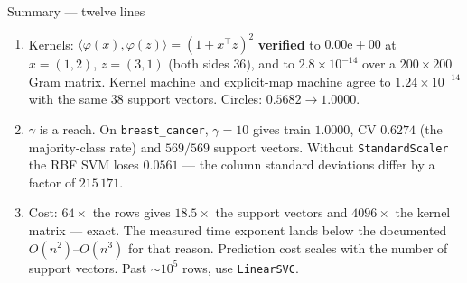 \documentclass[aspectratio=169]{beamer}
\begin{document}
\begin{frame}[shrink=24]{Summary --- twelve lines}
\begin{enumerate}
      $m \le 1$ and \texttt{n\_support\_} was $11$.
    \item Kernels: $\langle\varphi(x),\varphi(z)\rangle = (1+x^\top z)^2$
      \textbf{verified} to $0.00\mathrm{e}{+}00$ at $x=(1,2)$, $z=(3,1)$
      (both sides $36$), and to $2.8\times10^{-14}$ over a $200\times200$
      Gram matrix. Kernel machine and explicit-map machine agree to
      $1.24\times10^{-14}$ with the same $38$ support vectors. Circles:
      $0.5682 \to \mathbf{1.0000}$.
    \item $\gamma$ is a reach. On \texttt{breast\_cancer},
      $\gamma = 10$ gives train $1.0000$, CV $\mathbf{0.6274}$ (the
      majority-class rate) and $569/569$ support vectors. Without
      \texttt{StandardScaler} the RBF SVM loses $\mathbf{0.0561}$ --- the
      column standard deviations differ by a factor of $215\,171$.
    \item Cost: $64\times$ the rows gives $18.5\times$ the support vectors
      and $4096\times$ the kernel matrix --- exact. The measured time
      exponent lands below the documented $O(n^2)$--$O(n^3)$ for that reason.
      Prediction cost scales with the number of support vectors.
      Past $\sim10^5$ rows, use \texttt{LinearSVC}.
  \end{enumerate}
\end{frame}
\end{document}
